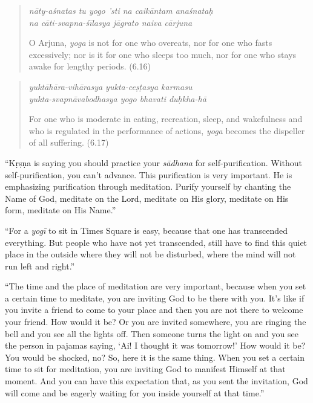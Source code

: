 \documentclass[12pt, twoside, openright]{memoir}
\begin{document}
\par
\begin{verse}
\textit{nāty-aśnatas tu yogo ’sti na caikāntam anaśnataḥ} \\
\textit{na cāti-svapna-śīlasya jāgrato naiva cārjuna}

\noindent O Arjuna, \textit{yoga} is not for one who overeats, nor for one who fasts excessively; nor is it for one who sleeps too much, nor for one who stays awake for lengthy periods. (6.16)
\end{verse}
\par



\par
\begin{verse}
\textit{yuktāhāra-vihārasya yukta-ceṣṭasya karmasu} \\
\textit{yukta-svapnāvabodhasya yogo bhavati duḥkha-hā}

\noindent For one who is moderate in eating, recreation, sleep, and wakefulness and who is regulated in the performance of actions, \textit{yoga} becomes the dispeller of all suffering. (6.17)
\end{verse}
\par



\enquote{Kṛṣṇa is saying you should practice your \textit{sādhana} for self-purification. Without self-purification, you can’t advance. This purification is very important. He is emphasizing purification through meditation. Purify yourself by chanting the Name of God, meditate on the Lord, meditate on His glory, meditate on His form, meditate on His Name.}

\enquote{For a \textit{yogī} to sit in Times Square is easy, because that one has transcended everything. But people who have not yet transcended, still have to find this quiet place in the outside where they will not be disturbed, where the mind will not run left and right.}

\enquote{The time and the place of meditation are very important, because when you set a certain time to meditate, you are inviting God to be there with you. It’s like if you invite a friend to come to your place and then you are not there to welcome your friend. How would it be? Or you are invited somewhere, you are ringing the bell and you see all the lights off. Then someone turns the light on and you see the person in pajamas saying, \enquote{Ai! I thought it was tomorrow!} How would it be? You would be shocked, no? So, here it is the same thing. When you set a certain time to sit for meditation, you are inviting God to manifest Himself at that moment. And you can have this expectation that, as you sent the invitation, God will come and be eagerly waiting for you inside yourself at that time.}
\end{document}
